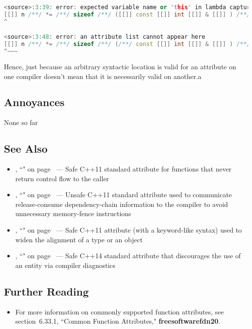 \begin{lstlisting}[language=C++]
<source>:3:39: error: expected variable name or 'this' in lambda capture list
[[]] n /**/ *= /**/ sizeof /**/ ([[]] const [[]] int [[]] & [[]] ) /**/;
^

<source>:3:48: error: an attribute list cannot appear here
[[]] n /**/ *= /**/ sizeof /**/ (/**/ const [[]] int [[]] & [[]] ) /**/;
^~~~
\end{lstlisting}

\noindent Hence, just because an arbitrary syntactic location is valid for an
attribute on one compiler doesn't mean that it is necessarily valid on
another.a

\subsection[Annoyances]{Annoyances}\label{annoyances}

None so far

\subsection[See Also]{See Also}\label{see-also}

\begin{itemize}
\item{\locationa, ``" on page~\pageref{the-noreturn-attribute} — Safe C++11 standard attribute for functions that never return control flow to the caller}
\item{\locatione, ``" on page~\pageref{carriesdependency} — Unsafe C++11 standard attribute used to communicate release-consume dependency-chain information to the compiler to avoid unnecessary memory-fence instructions}
\item{\locationa, ``" on page~\pageref{alignas} --- Safe C++11 attribute (with a keyword-like syntax) used to widen the alignment of a type or an object}
\item{\locationb, ``" on page~\pageref{deprecated} — Safe C++14 standard attribute that discourages the use of an entity via compiler diagnostics}
\end{itemize}

\subsection[Further Reading]{Further Reading}\label{attribute-further-reading}
\begin{itemize}
\item{For more information on commonly supported function attributes, see
section~6.33.1, ``Common Function Attributes," \textbf{{freesoftwarefdn20}}.}
\end{itemize}

